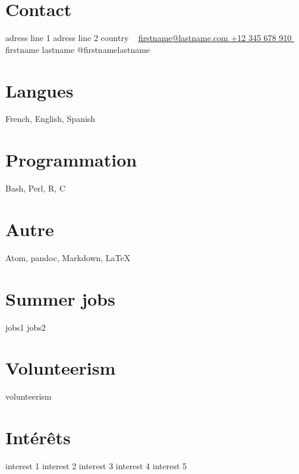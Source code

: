 \documentclass[]{classes/friggeri-resume}
\begin{document}
	\checkjobname

	\setlength{\textheight}{700pt}



	\begin{aside}
		\setlength{\fboxsep}{0pt}  %
		\setlength{\fboxrule}{2pt} %
		\section{Contact \faHome}
			adress line 1
			adress line 2
			country
			~
			\href{mailto:firstname@lastname.com}{firstname@lastname.com \faInbox}
			\href{tel:+12345678910}{+12 345 678 910 \faPhone}
			~
			firstname lastname \faLinkedin
			@firstnamelastname \faTwitter
		\section{Langues \faGlobe}
			French, English, Spanish
		\section{Programmation \faLaptop}
			Bash, Perl, R, C
		\section{Autre \faTerminal}
			Atom, pandoc, Markdown, \LaTeX
		\section{Summer jobs \faIndustry}
			jobs1
			jobs2
		\section{Volunteerism \faUsers}
			volunteerism
		\section{Intérêts \faHeart}
			interest 1
			interest 2
			interest 3
			interest 4
			interest 5
	\end{aside}
\end{document}
